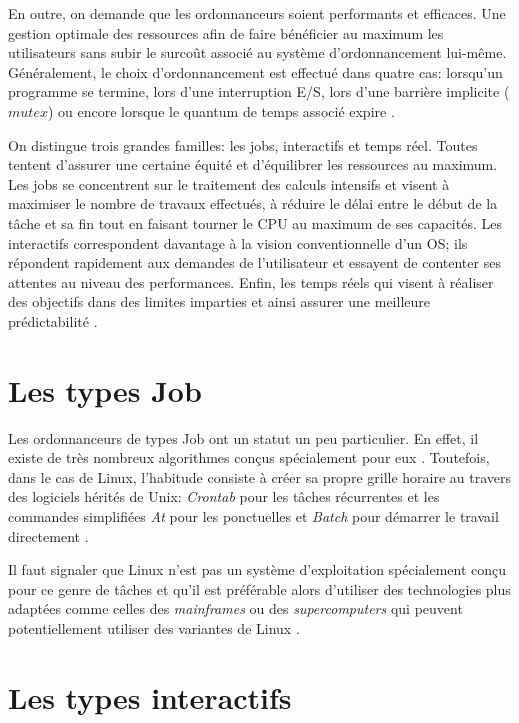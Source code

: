 \documentclass[letterpaper]{article}
\begin{document}
En outre, on demande que les ordonnanceurs soient performants et efficaces. Une gestion optimale des ressources afin de faire bénéficier au maximum les utilisateurs sans subir le surcoût associé au système d'ordonnancement lui-même. Généralement, le choix d'ordonnancement est effectué dans quatre cas: lorsqu'un programme se termine, lors d'une interruption E/S, lors d'une barrière implicite ($mutex$) ou encore lorsque le quantum de temps associé expire \citep{Bovet:2005:ULK:1077084}.

On distingue trois grandes familles: les jobs, interactifs et temps réel. Toutes tentent d'assurer une certaine équité et d'équilibrer les ressources au maximum. Les jobs se concentrent sur le traitement des calculs intensifs et visent à maximiser le nombre de travaux effectués, à réduire le délai entre le début de la tâche et sa fin tout en faisant tourner le CPU au maximum de ses capacités. Les interactifs correspondent davantage à la vision conventionnelle d'un OS; ils répondent rapidement aux demandes de l'utilisateur et essayent de contenter ses attentes au niveau des performances. Enfin, les temps réels qui visent à réaliser des objectifs dans des limites imparties et ainsi assurer une meilleure prédictabilité \citep{Tanenbaum:2005:OSD:1076555}.

\section{Les types Job}

Les ordonnanceurs de types Job ont un statut un peu particulier. En effet, il existe de très nombreux algorithmes conçus spécialement pour eux \citep{journals/cce/MendezCGHF06}. Toutefois, dans le cas de Linux, l'habitude consiste à créer sa propre grille horaire au travers des logiciels hérités de Unix: \textit{Crontab} pour les tâches récurrentes et les commandes simplifiées \textit{At} pour les ponctuelles et \textit{Batch} pour démarrer le travail directement \citep{x1994x}.

Il faut signaler que Linux n'est pas un système d'exploitation spécialement conçu pour ce genre de tâches et qu'il est préférable alors d'utiliser des technologies plus adaptées comme celles des \textit{mainframes} ou des \textit{supercomputers} qui peuvent potentiellement utiliser des variantes de Linux \citep{Encyclopedia:2011}.

\section{Les types interactifs}
\end{document}
